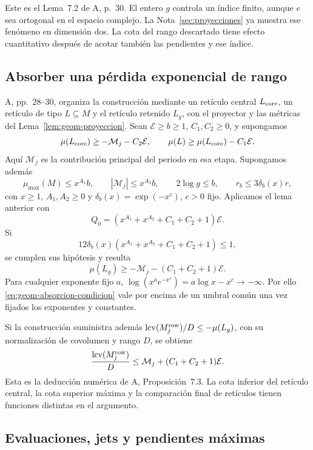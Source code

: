 Este es el Lema~7.2 de A, p.~30. El entero $g$ controla un índice
finito, aunque $e$ sea ortogonal en el espacio complejo. La
Nota~\ref{sec:proyecciones} ya muestra ese fenómeno en dimensión
dos. La cota del rango descartado tiene efecto cuantitativo
después de acotar también las pendientes y ese índice.

\subsection{Absorber una pérdida exponencial de rango}

A, pp.~28--30, organiza la construcción mediante un retículo
central $L_{\rm core}$, un retículo de tipo $L\subseteq M$
y el retículo retenido $L_g$, con el proyector y las métricas
del Lema~\ref{lem:geom-proyeccion}.
Sean $\mathcal E\ge b\ge1$, $C_1,C_2\ge0$, y supongamos
\[
 \mu(L_{\rm core})\ge-\mathcal M_j-C_2\mathcal E,\qquad
 \mu(L)\ge\mu(L_{\rm core})-C_1\mathcal E.
\]
Aquí $\mathcal M_j$ es la contribución principal del periodo
en esa etapa. Supongamos además
\[
 \mu_{\max}(M)\le x^{A_1}b,\qquad
 |\mathcal M_j|\le x^{A_2}b,\qquad
 2\log g\le b,\qquad
 r_b\le3\delta_b(x)r,
\]
con $x\ge1$, $A_1,A_2\ge0$ y
$\delta_b(x)=\exp(-x^c)$, $c>0$ fijo.
Aplicamos el lema anterior con
\[
 Q_0=(x^{A_1}+x^{A_2}+C_1+C_2+1)\mathcal E.
\]
Si
\begin{equation}
 12\delta_b(x)(x^{A_1}+x^{A_2}+C_1+C_2+1)\le1,
 \label{eq:geom-absorcion-condicion}
\end{equation}
se cumplen sus hipótesis y resulta
\begin{equation}
          \mu(L_g)\ge-\mathcal M_j-(C_1+C_2+1)\mathcal E.
 \label{eq:geom-core-final}
\end{equation}
Para cualquier exponente fijo $a$,
$\log(x^ae^{-x^c})=a\log x-x^c\to-\infty$.
Por ello \eqref{eq:geom-absorcion-condicion} vale por encima
de un umbral común una vez fijados los exponentes y constantes.

Si la construcción suministra además
$\operatorname{lcv}(M_j^{\rm row})/D\le-\mu(L_g)$,
con su normalización de covolumen y rango $D$, se obtiene
\[
 \frac{\operatorname{lcv}(M_j^{\rm row})}{D}
       \le\mathcal M_j+(C_1+C_2+1)\mathcal E.
\]
Esta es la deducción numérica de A, Proposición~7.3.
La cota inferior del retículo central, la cota superior máxima
y la comparación final de retículos tienen funciones distintas
en el argumento.

\subsection{Evaluaciones, jets y pendientes máximas}

